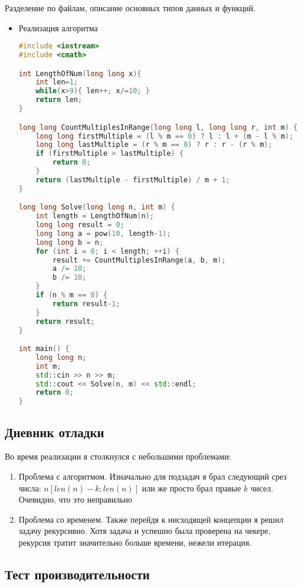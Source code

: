 \documentclass[12pt]{article}
\begin{document}
Разделение по файлам, описание основных типов данных и функций. \\
\begin{itemize}
    \item
        Реализация алгоритма
        \begin{lstlisting}[language=C++]
#include <iostream>
#include <cmath>

int LengthOfNum(long long x){
    int len=1;
    while(x>9){ len++; x/=10; }
    return len;
}

long long CountMultiplesInRange(long long l, long long r, int m) {
    long long firstMultiple = (l % m == 0) ? l : l + (m - l % m);
    long long lastMultiple = (r % m == 0) ? r : r - (r % m);
    if (firstMultiple > lastMultiple) {
        return 0;
    }
    return (lastMultiple - firstMultiple) / m + 1;
}

long long Solve(long long n, int m) {
    int length = LengthOfNum(n);
    long long result = 0;
    long long a = pow(10, length-1);
    long long b = n; 
    for (int i = 0; i < length; ++i) {
        result += CountMultiplesInRange(a, b, m);
        a /= 10;
        b /= 10;
    }
    if (n % m == 0) {
        return result-1;
    }
    return result;
}

int main() {
    long long n;
    int m;
    std::cin >> n >> m;
    std::cout << Solve(n, m) << std::endl;
    return 0;
}
        \end{lstlisting}
\end{itemize}

\subsection*{Дневник отладки}

Во время реализации я столкнулся с небольшими проблемами:
\begin{enumerate}
    \item Проблема с алгоритмом. Изначально для подзадач я брал следующий срез числа: $n[len(n) - k; len(n)]$ или же просто брал правые $k$ чисел. Очевидно, что это неправильно
    \item Проблема со временем. Также перейдя к нисходящей концепции я решил задачу рекурсивно. Хотя задача и успешно была проверена на чекере, рекурсия тратит значительно больше времени, нежели итерация.
\end{enumerate}

\subsection*{Тест производительности}
\end{document}
